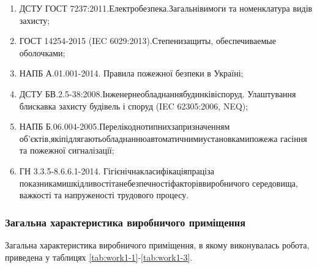 \begin{enumerate}
	\item ДСТУ ГОСТ 7237:2011.\hfill Електробезпека.\hfill Загальні\hfill вимоги\newline \hspace*{-18mm} та номенклатура видів захисту;
	\item ГОСТ 14254-2015 (IEC 6029:2013).\hfill Степени\hfill защиты,\newline \hspace*{-18mm} обеспечиваемые оболочками;
	\item НАПБ А.01.001-2014. Правила пожежної безпеки в Україні;
	\item ДСТУ БВ.2.5-38:2008.\hfill Інженерне\hfill обладнання\hfill будинків\hfill і\hfill споруд.\newline \hspace*{-18mm} Улаштування блискавка захисту будівель і споруд (IEC 62305:2006, NEQ);
	\item НАПБ Б.06.004-2005.\hfill Перелік\hfill однотипних\hfill за\hfill призначенням\newline \hspace*{-18mm} об’єктів,\hfill які\hfill підлягають\hfill обладнанню\hfill автоматичними\hfill установками\hfill пожежа\newline \hspace*{-18mm} гасіння та пожежної сигналізації;
	\item ГН 3.3.5-8.6.6.1-2014. \hfill Гігієнічна\hfill класифікація\hfill праці\hfill за\newline \hspace*{-18mm} показниками\hfill шкідливості\hfill та\hfill небезпечності\hfill факторів\hfill виробничого\newline \hspace*{-18mm} середовища, важкості та напруженості трудового процесу.
\end{enumerate}

\subsubsection{Загальна характеристика виробничого приміщення}

Загальна характеристика виробничого приміщення, в якому виконувалась робота, приведена у таблицях \ref{tab:work1-1}-\ref{tab:work1-3}.

